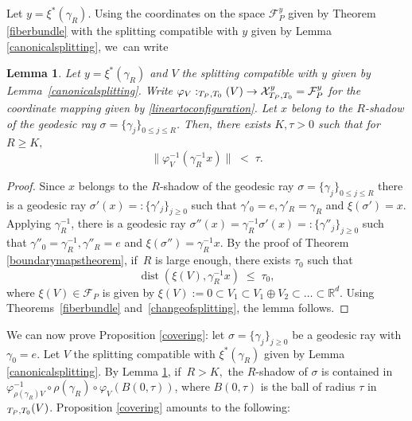 \documentclass[JEP,XML,SOM,Unicode,NoEqCountersInSection,published]{cedram}
\newcommand{\NoChangel}[1]{%
\expandafter\let\csname old\string#1\endcsname=#1
\let#1=\relax
\newcommand{#1}{\mathop{\mathcode`l="716C\csname old\string#1\endcsname\mathcode`l="7160}\displaylimits}%
}
\newtheorem{lemma}[theorem]{Lemma}
\newcommand{\R}{\mathbb{R}}
\newcommand{\F}{\mathcal{F}}
\newcommand{\X}{\mathcal{X}}
\let\g\gamma
\let\s\sigma
\DeclareMathOperator{\dist}{dist}
\DeclareMathOperator{\nil}{Nil}\NoChangel{\nil}
\begin{document}
Let \(y =\xi^\ast (\g_R) \). Using the coordinates on the space \(\F_P^y\) given by Theorem \ref{fiberbundle} with the splitting compatible with \(y\) given by Lemma \ref{canonicalsplitting}, we~can write
\begin{lemma}\label{angle} Let \(y =\xi^\ast (\g_R) \) and \(V\) the splitting compatible with \(y\) given by Lemma~\ref{canonicalsplitting}. Write \(\varphi_V: \nil_{T_P,T_0}(V) \to \X_{T_P,T_0}^{y} = \F_P^y\) for the coordinate mapping given by \eqref{lineartoconfiguration}. Let \(x \) belong to the \(R\)-shadow of the geodesic ray \(\s =\{ \g_j \}_{0\leq j \leq R} \). Then, there exists \(K, \tau >0\) such that for \(R \geq K, \) \begin{equation*} \| \varphi_V^{-1} (\g_R^{-1}x) \|\; < \; \tau. \end{equation*} \end{lemma}
\begin{proof} Since \(x \) belongs to the \(R\)-shadow of the geodesic ray \(\s =\{ \g_j \}_{0\leq j \leq R} \) there is a geodesic ray \(\s' (x)=:\{ \g'_j \}_{j \geq 0} \) such that \(\g'_0= e, \g'_R = \g_R\) and \(\xi (\s') = x\). Applying \(\g_R^{-1}\), there is a geodesic ray \(\s''(x) =\g_R^{-1} \s'(x) =: \{ \g''_j \}_{j \geq 0} \) such that \(\g''_0 = \g_R^{-1}, \g''_R = e\) and \(\xi (\s'') = \g_R^{-1} x\). By the proof of Theorem \ref{boundarymapstheorem}, if~\(R\) is large enough, there exists \(\tau_0\) such that
\[
 \dist (\xi (V), \g_R^{-1} x) \; \le \;\tau_0,
\]
where \(\xi (V) \in \F_P \) is given by \(\xi (V) := {0} \subset V_1 \subset V_1 \oplus V_2 \subset \ldots \subset \R^d \). Using Theorems~\ref{fiberbundle} and~\ref{changeofsplitting}, the lemma follows. \end{proof}

We can now prove Proposition \ref{covering}: let \(\s =\{ \g_j \}_{j \geq 0} \) be a geodesic ray with \(\g_0 = e\). Let \(V\) the splitting compatible with \(\xi^\ast (\g_R) \) given by Lemma \ref{canonicalsplitting}. By Lemma \ref{angle}, if~\(R >K, \) the \(R \)-shadow of \(\s\) is contained in \(\varphi_{\rho(\g_R) V}^{-1}\circ \rho(\g_R) \circ \varphi_V (B(0, \tau))\), where \(B(0, \tau) \) is the ball of radius \(\tau \) in \(\nil_{T_P,T_0}(V)\). Proposition \ref{covering} amounts to the following:
\end{document}
